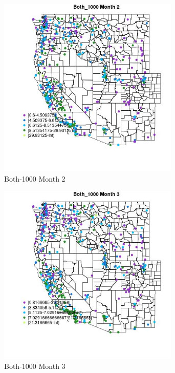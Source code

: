 \begin{figure} 
\centering  
\includegraphics[width=0.77\textwidth]{Code_Outputs/ML_input_report_ML_input_PM25_Step5_part_d_de_duplicated_aves_ML_input_MapObsMo2Both_1000.jpg} 
\caption{\label{fig:ML_input_report_ML_input_PM25_Step5_part_d_de_duplicated_aves_ML_inputMapObsMo2Both_1000}Both-1000 Month 2} 
\end{figure} 
 

\begin{figure} 
\centering  
\includegraphics[width=0.77\textwidth]{Code_Outputs/ML_input_report_ML_input_PM25_Step5_part_d_de_duplicated_aves_ML_input_MapObsMo3Both_1000.jpg} 
\caption{\label{fig:ML_input_report_ML_input_PM25_Step5_part_d_de_duplicated_aves_ML_inputMapObsMo3Both_1000}Both-1000 Month 3} 
\end{figure} 
 

